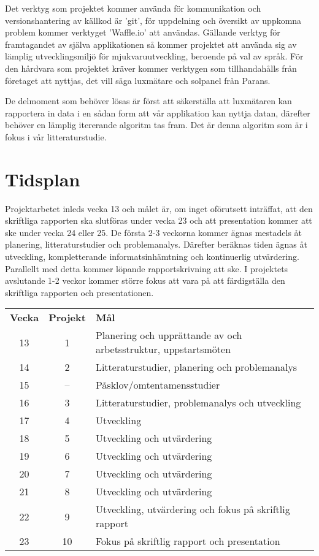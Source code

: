 \documentclass[a4paper, 12pt]{article}
\begin{document}
    Det verktyg som projektet kommer använda för kommunikation och versionshantering av källkod är 'git', för uppdelning och översikt av uppkomna problem kommer verktyget 'Waffle.io' att användas. Gällande verktyg för framtagandet av själva applikationen så kommer projektet att an\-vända sig av lämplig utvecklingsmiljö för mjukvaruutveckling, beroende på val av språk. För den hårdvara som projektet kräver kommer verktygen som tillhandahålls från företaget att nyttjas, det vill säga luxmätare och solpanel från Parans. \bigskip 

    De delmoment som behöver lösas är först att säkerställa att luxmätaren kan rapportera in data i en sådan form att vår applikation kan nyttja datan, därefter behöver en lämplig itererande algoritm tas fram. Det är denna algoritm som är i fokus i vår litteraturstudie.

\section{Tidsplan}
\label{sec:tidsplan} %
    Projektarbetet inleds vecka 13 och målet är, om inget oförutsett inträffat, att den skriftliga rapporten ska slutföras under vecka 23 och att presentation kommer att ske under vecka 24 eller 25. De första 2-3 veckorna kommer ägnas mestadels åt planering, litteraturstudier och problemanalys. Därefter beräknas tiden ägnas åt utveckling, kompletterande informatsinhämtning och kontinuerlig utvärdering. Parallellt med detta kommer löpande rapportskrivning att ske. I projektets avslutande 1-2 veckor kommer större fokus att vara på att färdigställa den skriftliga rapporten och presentationen. \bigskip

    \noindent \begin{tabularx}{\textwidth}{@{}ccX}
        \textbf{Vecka} & \textbf{Projekt} & \textbf{Mål}\\
        13 & 1 & Planering och upprättande av och arbetsstruktur, uppstartsmöten \\
        14 & 2  & Litteraturstudier, planering och problemanalys \\
        15 & -- & Påsklov/omtentamensstudier \\
        16 & 3  & Litteraturstudier, problemanalys och utveckling \\
        17 & 4  & Utveckling \\
        18 & 5  & Utveckling och utvärdering \\
        19 & 6  & Utveckling och utvärdering \\
        20 & 7  & Utveckling och utvärdering \\
        21 & 8  & Utveckling och utvärdering \\
        22 & 9  & Utveckling, utvärdering och fokus på skriftlig rapport \\
        23 & 10 & Fokus på skriftlig rapport och presentation \\
    \end{tabularx}

\end{document}
